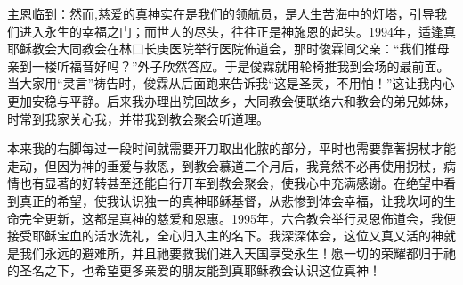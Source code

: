 \documentclass[UTF8,a4paper,oneside,twocolumn,12pt]{ctexbook}
\begin{document}
主恩临到：然而,慈爱的真神实在是我们的领航员，是人生苦海中的灯塔，引导我们进入永生的幸福之门；而世人的尽头，往往正是神施恩的起头。1994年，适逢真耶稣教会大同教会在林口长庚医院举行医院佈道会，那时俊霖间父亲：“我们推母亲到一楼听福音好吗？”外子欣然答应。于是俊霖就用轮椅推我到会场的最前面。当大家用“灵言”祷告时，俊霖从后面跑来告诉我“这是圣灵，不用怕！”这让我内心更加安稳与平静。后来我办理出院回故乡，大同教会便联络六和教会的弟兄姊妹，时常到我家关心我，并带我到教会聚会听道理。

本来我的右脚每过一段时间就需要开刀取出化脓的部分，平时也需要靠著拐杖才能走动，但因为神的垂爱与救恩，到教会慕道二个月后，我竟然不必再使用拐杖，病情也有显著的好转甚至还能自行开车到教会聚会，使我心中充满感谢。在绝望中看到真正的希望，使我认识独一的真神耶稣基督，从悲惨到体会幸福，让我坎坷的生命完全更新，这都是真神的慈爱和恩惠。1995年，六合教会举行灵恩佈道会，我便接受耶稣宝血的活水洗礼，全心归入主的名下。我深深体会，这位又真又活的神就是我们永远的避难所，并且祂要救我们进入天国享受永生！愿一切的荣耀都归于祂的圣名之下，也希望更多亲爱的朋友能到真耶稣教会认识这位真神！

\backmatter
\end{document}

